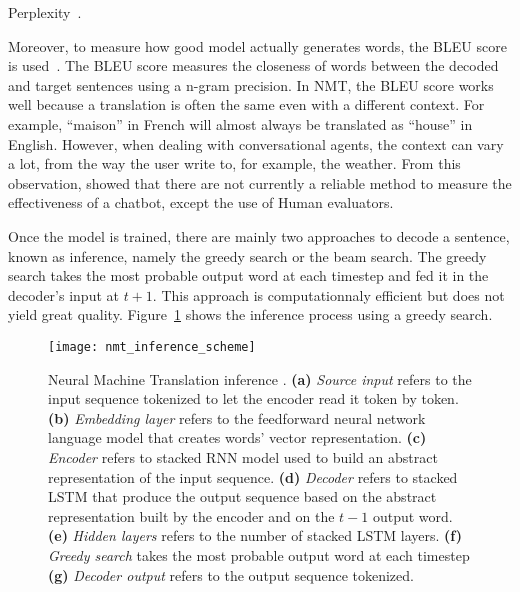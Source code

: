 Perplexity~\citet{jurafsky2014speech}.

Moreover, to measure how good model actually generates words, the BLEU score is used~\citep{bleu-score}. The BLEU score measures the closeness of words between the decoded and target sentences using a n-gram precision.
In NMT, the BLEU score works well because a translation is often the same even with a different context. For example, ``maison'' in French will almost always be translated as ``house'' in English.
However, when dealing with conversational agents, the context can vary a lot, from the way the user write to, for example, the weather. From this observation, \citet{1603.08023} showed that there are not currently a reliable method to measure the effectiveness of a chatbot, except the use of Human evaluators.

Once the model is trained, there are mainly two approaches to decode a sentence, known as inference, namely the greedy search or the beam search. The greedy search takes the most probable output word at each timestep and fed it in the decoder's input at $t+1$. This approach is computationnaly efficient but does not yield great quality. Figure~\ref{fig:nmt-inference} shows the inference process using a greedy search.
\begin{figure}
    \centering
    \texttt{[image: nmt\_inference\_scheme]}
    \decoRule
    \caption[Neural Machine Translation inference scheme]{Neural Machine Translation inference \citep{tensorflow.nmt}. \textbf{(a)} \textit{Source input} refers to the input sequence tokenized to let the encoder read it token by token. \textbf{(b)} \textit{Embedding layer} refers to the feedforward neural network language model that creates words' vector representation. \textbf{(c)} \textit{Encoder} refers to stacked RNN model used to build an abstract representation of the input sequence. \textbf{(d)} \textit{Decoder} refers to stacked LSTM that produce the output sequence based on the abstract representation built by the encoder and on the $t-1$ output word. \textbf{(e)} \textit{Hidden layers} refers to the number of stacked LSTM layers. \textbf{(f)} \textit{Greedy search} takes the most probable output word at each timestep  \textbf{(g)} \textit{Decoder output} refers to the output sequence tokenized.}
    \label{fig:nmt-inference}
\end{figure}

